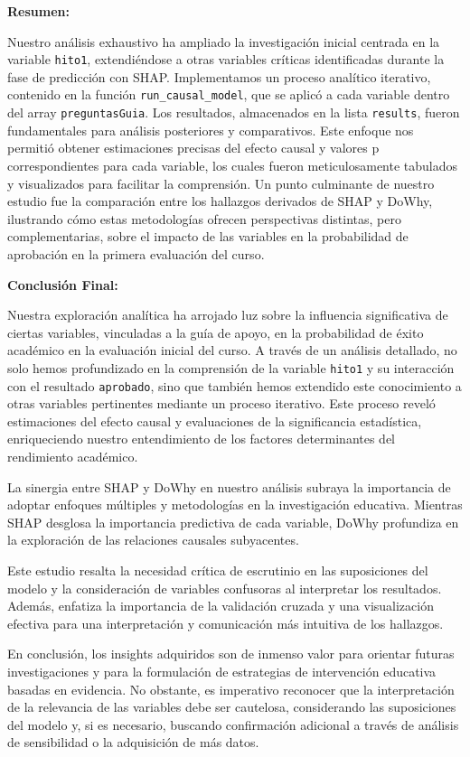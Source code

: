 \textbf{Resumen:}

Nuestro análisis exhaustivo ha ampliado la investigación inicial centrada en la variable \texttt{hito1}, extendiéndose a otras variables críticas identificadas durante la fase de predicción con SHAP. Implementamos un proceso analítico iterativo, contenido en la función \texttt{run\_causal\_model}, que se aplicó a cada variable dentro del array \texttt{preguntasGuia}. Los resultados, almacenados en la lista \texttt{results}, fueron fundamentales para análisis posteriores y comparativos. Este enfoque nos permitió obtener estimaciones precisas del efecto causal y valores p correspondientes para cada variable, los cuales fueron meticulosamente tabulados y visualizados para facilitar la comprensión. Un punto culminante de nuestro estudio fue la comparación entre los hallazgos derivados de SHAP y DoWhy, ilustrando cómo estas metodologías ofrecen perspectivas distintas, pero complementarias, sobre el impacto de las variables en la probabilidad de aprobación en la primera evaluación del curso.

\textbf{Conclusión Final:}

Nuestra exploración analítica ha arrojado luz sobre la influencia significativa de ciertas variables, vinculadas a la guía de apoyo, en la probabilidad de éxito académico en la evaluación inicial del curso. A través de un análisis detallado, no solo hemos profundizado en la comprensión de la variable \texttt{hito1} y su interacción con el resultado \texttt{aprobado}, sino que también hemos extendido este conocimiento a otras variables pertinentes mediante un proceso iterativo. Este proceso reveló estimaciones del efecto causal y evaluaciones de la significancia estadística, enriqueciendo nuestro entendimiento de los factores determinantes del rendimiento académico.

La sinergia entre SHAP y DoWhy en nuestro análisis subraya la importancia de adoptar enfoques múltiples y metodologías en la investigación educativa. Mientras SHAP desglosa la importancia predictiva de cada variable, DoWhy profundiza en la exploración de las relaciones causales subyacentes.

Este estudio resalta la necesidad crítica de escrutinio en las suposiciones del modelo y la consideración de variables confusoras al interpretar los resultados. Además, enfatiza la importancia de la validación cruzada y una visualización efectiva para una interpretación y comunicación más intuitiva de los hallazgos.

En conclusión, los insights adquiridos son de inmenso valor para orientar futuras investigaciones y para la formulación de estrategias de intervención educativa basadas en evidencia. No obstante, es imperativo reconocer que la interpretación de la relevancia de las variables debe ser cautelosa, considerando las suposiciones del modelo y, si es necesario, buscando confirmación adicional a través de análisis de sensibilidad o la adquisición de más datos.